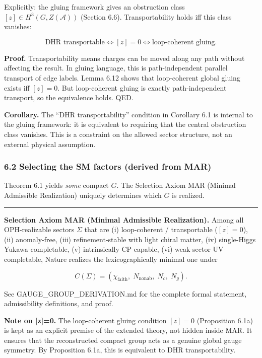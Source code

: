 \documentclass[
]{article}
\begin{document}
Explicitly: the gluing framework gives an obstruction class
\([z] \in H^3(G, Z(\mathcal{A}))\) (Section 6.6). Transportability holds
iff this class vanishes:

\[
\text{DHR transportable} \iff [z] = 0 \iff \text{loop-coherent gluing}.
\]

\textbf{Proof.} Transportability means charges can be moved along any
path without affecting the result. In gluing language, this is
path-independent parallel transport of edge labels. Lemma 6.12 shows
that loop-coherent global gluing exists iff \([z] = 0\). But
loop-coherent gluing is exactly path-independent transport, so the
equivalence holds. QED.

\textbf{Corollary.} The ``DHR transportability'' condition in Corollary
6.1 is internal to the gluing framework: it is equivalent to requiring
that the central obstruction class vanishes. This is a constraint on the
allowed sector structure, not an external physical assumption.

\subsubsection{6.2 Selecting the SM factors (derived from
MAR)}\label{selecting-the-sm-factors-derived-from-mar}

Theorem 6.1 yields \emph{some} compact \(G\). The Selection Axiom MAR
(Minimal Admissible Realization) uniquely determines which \(G\) is
realized.

\begin{center}\rule{0.5\linewidth}{0.5pt}\end{center}

\textbf{Selection Axiom MAR (Minimal Admissible Realization).} Among all
OPH-realizable sectors \(\Sigma\) that are (i) loop-coherent /
transportable (\([z]=0\)), (ii) anomaly-free, (iii) refinement-stable
with light chiral matter, (iv) single-Higgs Yukawa-completable, (v)
intrinsically CP-capable, (vi) weak-sector UV-completable, Nature
realizes the lexicographically minimal one under

\[C(\Sigma) = (\chi_{\mathrm{faith}},\; N_{\mathrm{nonab}},\; N_c,\; N_g).\]

See GAUGE\_GROUP\_DERIVATION.md for the complete formal statement,
admissibility definitions, and proof.

\textbf{Note on {[}z{]}=0.} The loop-coherent gluing condition \([z]=0\)
(Proposition 6.1a) is kept as an explicit premise of the extended
theory, not hidden inside MAR. It ensures that the reconstructed compact
group acts as a genuine global gauge symmetry. By Proposition 6.1a, this
is equivalent to DHR transportability.
\end{document}
